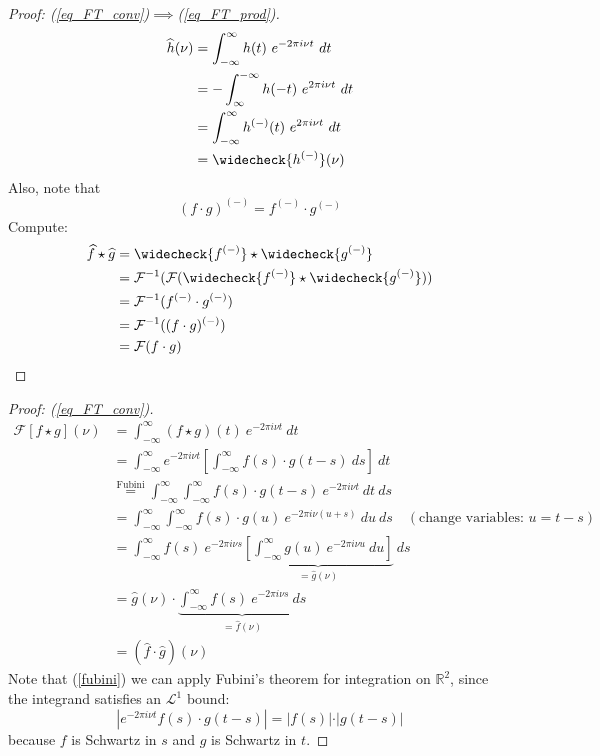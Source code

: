 \documentclass[12pt, reqno]{amsart}
\theoremstyle{definition}
\theoremstyle{remark}
\begin{document}
\begin{itemize}
\begin{proof}[Proof: (\ref{eq_FT_conv})$\implies$(\ref{eq_FT_prod})]
\begin{align*}
\widehat h(\nu)&= \int_{-\infty}^{\infty}h(t)~e^{-2\pi i \nu t}\ dt\\
&= -\int_{\infty}^{-\infty}h(-t)~e^{2\pi i \nu t}\ dt\\
&= \int_{-\infty}^{\infty}h^{(-)}(t)~e^{2\pi i \nu t}\ dt\\
&= \widecheck{h^{(-)}}(\nu)
\end{align*}
Also, note that $$(f\cdot g)^{(-)}=f^{(-)}\cdot g^{(-)}$$
Compute:
\begin{align*}
\widehat f\star \widehat g&= \widecheck{f^{(-)}}\star\widecheck{g^{(-)}}\\
&= \mathcal{F}^{-1}(\mathcal{F}(\widecheck{f^{(-)}}\star\widecheck{g^{(-)}}))\\
&= \mathcal{F}^{-1}(f^{(-)}\cdot g^{(-)})\\
&= \mathcal{F}^{-1}((f\cdot g)^{(-)})\\
&= \mathcal{F}(f\cdot g)
\end{align*}
\end{proof}

\begin{proof}[Proof: (\ref{eq_FT_conv})]
\begin{align}
        \mathcal{F}[f\star g](\nu)&= \int_{-\infty}^{\infty}(f\star g)(t)~e^{-2\pi i \nu t}\ dt\\
        &= \int_{-\infty}^{\infty}e^{-2\pi i \nu t} \left[\int_{-\infty}^{\infty}f(s)\cdot g(t-s)\ ds\right]\ dt\\
        &\overset{\text{Fubini}}{=} \int_{-\infty}^{\infty}\int_{-\infty}^{\infty}f(s)\cdot g(t-s)~e^{-2\pi i \nu t}\ dt\ ds \label{fubini}
        \\
        &= \int_{-\infty}^{\infty}\int_{-\infty}^{\infty}f(s)\cdot g(u)~e^{-2\pi i \nu(u+s)}\ du\ ds\quad(\text{change variables: }u=t-s)\\
        &= \int_{-\infty}^{\infty}f(s)~e^{-2\pi i \nu s}\underbrace{\left[\int_{-\infty}^{\infty}g(u)~e^{-2\pi i \nu u}\ du\right]}_{=\widehat g(\nu)}\ ds\\
        &= \widehat g(\nu)\cdot\underbrace{\int_{-\infty}^{\infty}f(s)~e^{-2\pi i \nu s}\ ds}_{=\widehat{f}(\nu)}\\
        &= (\widehat f\cdot\widehat g)(\nu)
        \end{align}
        Note that (\ref{fubini}) we can apply Fubini's theorem for integration on $\mathbb{R}^{2}$, since the integrand satisfies an $\mathcal{L}^{1}$ bound:
        $$
        \left|e^{-2\pi i \nu t}f(s)\cdot g(t-s)\right|=\left|f(s)|\cdot |g(t-s)\right|
        $$
        because $f$ is Schwartz in $s$ and $g$ is Schwartz in $t$. 
\end{proof}


\end{itemize}
\end{document}
